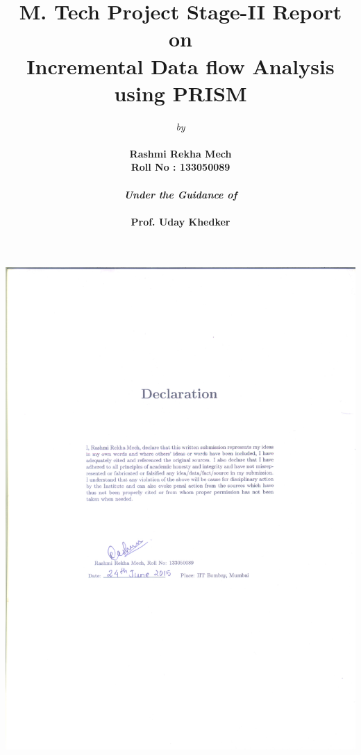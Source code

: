 \documentclass[11pt,a4paper,openright]{report}
\title{\textbf{M. Tech Project Stage-II Report}\\ on \\\textbf{Incremental Data flow Analysis using PRISM}}
\author{\emph{by}\\ \\ \bf{Rashmi Rekha Mech}\\\bf{Roll No : 133050089} \\
\\ \emph{Under the Guidance of}\\ \\\textbf{Prof. Uday Khedker}\\}
\date{}
\begin{document}
\maketitle

\centering
\includegraphics[width=1.3\textwidth, height=1.3\textheight]{declaration.eps}
\end{document}
